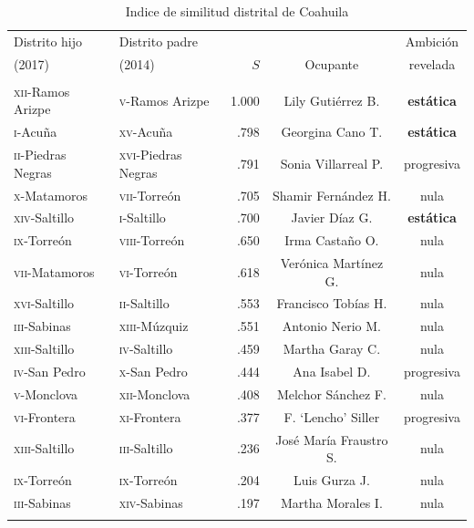 \documentclass[letter,12pt]{article}
\begin{document}
\begin{table}
  \centering
\begin{tabular}{llrcc}
 Distrito hijo               &  Distrito padre             &       &          & Ambición  \\ [-.5ex]
 (2017)                      &  (2014)                     &  $S$  & Ocupante & revelada \\ \hline
\\ [-1.2ex]
 \textsc{xii}-Ramos Arizpe   & \textsc{v}-Ramos Arizpe     & 1.000 & Lily Gutiérrez B.      & \textbf{estática} \\
 \textsc{i}-Acuña            & \textsc{xv}-Acuña           &  .798 & Georgina Cano T.       & \textbf{estática} \\ 
 \textsc{ii}-Piedras Negras  & \textsc{xvi}-Piedras Negras &  .791 & Sonia Villarreal P.    & progresiva        \\ 
 \textsc{x}-Matamoros        & \textsc{vii}-Torreón        &  .705 & Shamir Fernández H.    & nula              \\ 
 \textsc{xiv}-Saltillo       & \textsc{i}-Saltillo         &  .700 & Javier Díaz G.         & \textbf{estática} \\ 
 \textsc{ix}-Torreón         & \textsc{viii}-Torreón       &  .650 & Irma Castaño O.        & nula              \\ 
 \textsc{vii}-Matamoros      & \textsc{vi}-Torreón         &  .618 & Verónica Martínez G.   & nula              \\ 
 \textsc{xvi}-Saltillo       & \textsc{ii}-Saltillo        &  .553 & Francisco Tobías H.    & nula              \\ 
 \textsc{iii}-Sabinas        & \textsc{xiii}-Múzquiz       &  .551 & Antonio Nerio M.       & nula              \\ 
 \textsc{xiii}-Saltillo      & \textsc{iv}-Saltillo        &  .459 & Martha Garay C.        & nula              \\ 
 \textsc{iv}-San Pedro       & \textsc{x}-San Pedro        &  .444 & Ana Isabel D.          & progresiva        \\ 
 \textsc{v}-Monclova         & \textsc{xii}-Monclova       &  .408 & Melchor Sánchez F.     & nula              \\ 
 \textsc{vi}-Frontera        & \textsc{xi}-Frontera        &  .377 & F. `Lencho' Siller     & progresiva        \\ 
 \textsc{xiii}-Saltillo      & \textsc{iii}-Saltillo       &  .236 & José María Fraustro S. & nula              \\ 
 \textsc{ix}-Torreón         & \textsc{ix}-Torreón         &  .204 & Luis Gurza J.          & nula              \\ 
 \textsc{iii}-Sabinas        & \textsc{xiv}-Sabinas        &  .197 & Martha Morales I.      & nula              \\ 
 \\ [-1.2ex] \hline
\end{tabular}
\caption{Indice de similitud distrital de Coahuila}\label{T:dsi}
\end{table}
\end{document}
